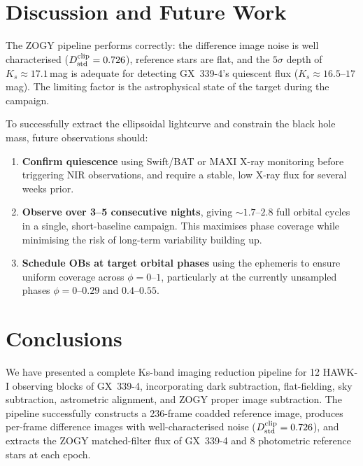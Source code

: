 \documentclass[12pt,a4paper]{article}
\begin{document}
\section{Discussion and Future Work}
\label{sec:discussion}

The ZOGY pipeline performs correctly: the difference image noise is well
characterised ($D_{\rm std}^{\rm clip} = 0.726$), reference stars are flat,
and the $5\sigma$ depth of $K_s \approx 17.1$\,mag is adequate for detecting
GX~339-4's quiescent flux ($K_s \approx 16.5$--$17$\,mag). The limiting factor
is the astrophysical state of the target during the campaign.

To successfully extract the ellipsoidal lightcurve and constrain the black hole
mass, future observations should:

\begin{enumerate}
  \item \textbf{Confirm quiescence} using Swift/BAT or MAXI X-ray monitoring
        before triggering NIR observations, and require a stable, low X-ray
        flux for several weeks prior.
  \item \textbf{Observe over 3--5 consecutive nights}, giving $\sim 1.7$--$2.8$
        full orbital cycles in a single, short-baseline campaign. This maximises
        phase coverage while minimising the risk of long-term variability
        building up.
  \item \textbf{Schedule OBs at target orbital phases} using the
        \citet{Heida2017} ephemeris to ensure uniform coverage across $\phi =
        0$--$1$, particularly at the currently unsampled phases
        $\phi = 0$--$0.29$ and $0.4$--$0.55$.
\end{enumerate}

\section{Conclusions}
\label{sec:conclusions}

We have presented a complete Ks-band imaging reduction pipeline for 12 HAWK-I
observing blocks of GX~339-4, incorporating dark subtraction, flat-fielding,
sky subtraction, astrometric alignment, and ZOGY proper image subtraction. The
pipeline successfully constructs a 236-frame coadded reference image, produces
per-frame difference images with well-characterised noise ($D_{\rm std}^{\rm
clip} = 0.726$), and extracts the ZOGY matched-filter flux of GX~339-4 and 8
photometric reference stars at each epoch.
\end{document}
